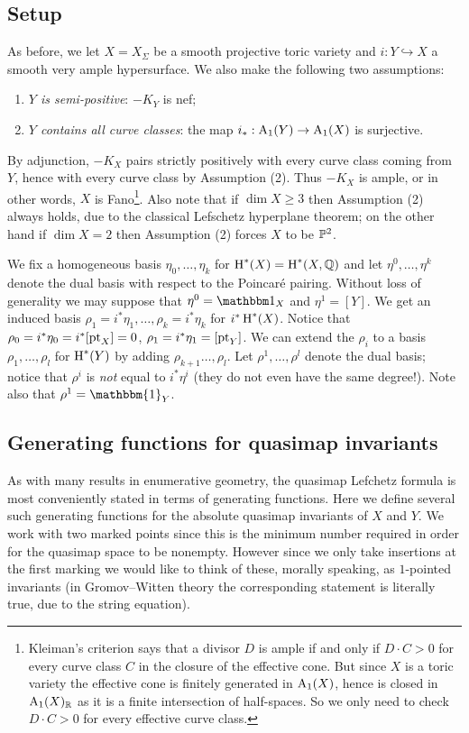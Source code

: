 \subsection{Setup} \label{Subsection setup}
As before, we let $X=X_{\Sigma}$ be a smooth projective toric variety and $i \colon Y \hookrightarrow X$ a smooth very ample hypersurface. We also make the following two assumptions:
\begin{enumerate}
\item \emph{$Y$ is semi-positive}: $-K_Y$ is nef;
\item \emph{$Y$ contains all curve classes}: the map $i_* : \operatorname{A}_1(Y) \rightarrow \operatorname{A}_1(X)$ is surjective.
\end{enumerate}
By adjunction, $-K_X$ pairs strictly positively with every curve class coming from $Y$, hence with every curve class by Assumption (2). Thus $-K_X$ is ample, or in other words, $X$ is Fano\footnote{Kleiman's criterion says that a divisor $D$ is ample if and only if $D \cdot C > 0$ for every curve class $C$ in the closure of the effective cone. But since $X$ is a toric variety the effective cone is finitely generated in $\operatorname{A}_1(X)$, hence is closed in $\operatorname{A}_1(X)_{\mathbb{R}}$ as it is a finite intersection of half-spaces. So we only need to check $D \cdot C > 0$ for every effective curve class.}. Also note that if $\dim X \geq 3$ then Assumption (2) always holds, due to the classical Lefschetz hyperplane theorem; on the other hand if $\dim X = 2$ then Assumption (2) forces $X$ to be $\mathbb P^2$.

We fix a homogeneous basis $\eta_0, \ldots, \eta_k$ for $\operatorname{H}^*(X) = \operatorname{H}^*(X,\mathbb{Q})$ and let $\eta^0, \ldots, \eta^k$ denote the dual basis with respect to the Poincar\'e pairing. Without loss of generality we may suppose that $\eta^0=\mathbbm 1_X$ and $\eta^1=[Y]$. We get an induced basis $\rho_1=i^*\eta_1, \ldots, \rho_k = i^* \eta_k$ for $i^*\operatorname{H}^*(X)$. Notice that $\rho_0 = i^* \eta_0 = i^* [\operatorname{pt}_X] = 0$, $\rho_1 = i^* \eta_1 = [\operatorname{pt}_Y]$.  We can extend the $\rho_i$ to a basis $\rho_1, \ldots, \rho_l$ for $\operatorname{H}^*(Y)$ by adding $\rho_{k+1}\ldots,\rho_{l}$. Let $\rho^1, \ldots, \rho^l$ denote the dual basis; notice that $\rho^i$ is \emph{not} equal to $i^* \eta^i$ (they do not even have the same degree!).  Note also that $\rho^1 = \mathbbm{1}_Y$.

\subsection{Generating functions for quasimap invariants}
As with many results in enumerative geometry, the quasimap Lefchetz formula is most conveniently stated in terms of generating functions. Here we define several such generating functions for the absolute quasimap invariants of $X$ and $Y$.  We work with two marked points since this is the minimum number required in order for the quasimap space to be nonempty. However since we only take insertions at the first marking we would like to think of these, morally speaking, as $1$-pointed invariants (in Gromov--Witten theory the corresponding statement is literally true, due to the string equation).

